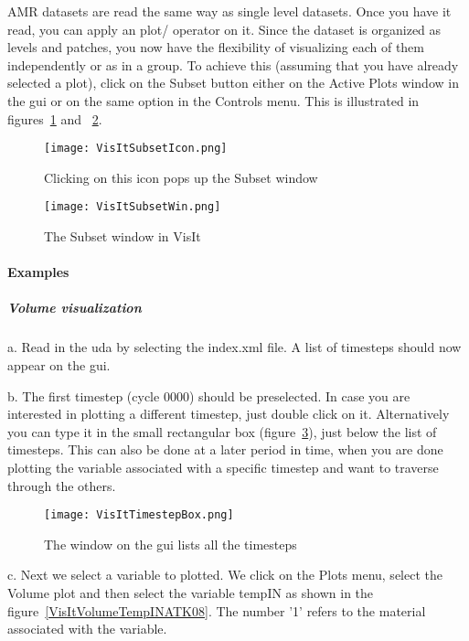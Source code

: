 AMR datasets are read the same way as single level datasets. Once you have it read, you can apply an plot/ operator on it. Since the dataset is organized as levels and patches, you now have the flexibility of visualizing each of them independently or as in a group. To achieve this (assuming that you have already selected a plot), click on the Subset button either on the Active Plots window in the gui or on the same option in the Controls menu. This is illustrated in figures~\ref{VisItSubsetIcon} and ~\ref{VisItSubsetWin}.

\begin{figure}
  \center
  \texttt{[image: VisItSubsetIcon.png]}
  \caption{Clicking on this icon pops up the Subset window}
  \label{VisItSubsetIcon}
\end{figure}

\begin{figure}
  \center
  \texttt{[image: VisItSubsetWin.png]}
  \caption{The Subset window in VisIt}
  \label{VisItSubsetWin}
\end{figure}

\paragraph{Examples}

\subparagraph{Volume visualization}

a. Read in the uda by selecting the index.xml file. A list of timesteps should now appear on the gui.

b. The first timestep (cycle 0000) should be preselected. In case you are interested in plotting a different timestep, just double click on it. Alternatively you can type it in the small rectangular box (figure~\ref{VisItTimestepBox}), just below the list of timesteps. This can also be done at a later period in time, when you are done plotting the variable associated with a specific timestep and want to traverse through the others.

\begin{figure}
  \center
  \texttt{[image: VisItTimestepBox.png]}
  \caption{The window on the gui lists all the timesteps}
  \label{VisItTimestepBox}
\end{figure}

c. Next we select a variable to plotted. We click on the Plots menu, select the Volume plot and then select the variable tempIN as shown in the figure~\ref{VisItVolumeTempINATK08}. The number '1' refers to the material associated with the variable.

